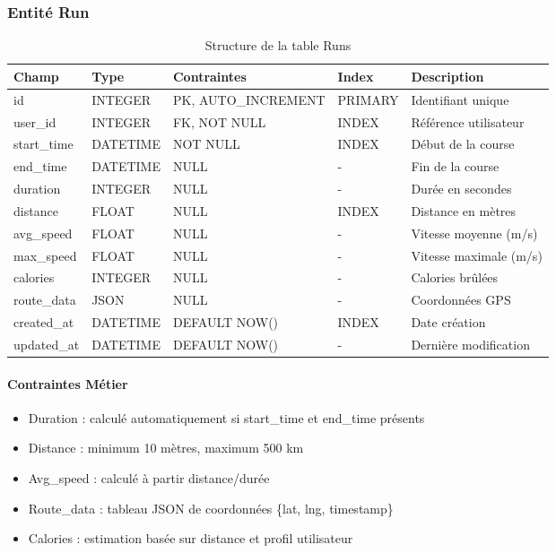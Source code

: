 \subsubsection{Entité Run}

\begin{table}[H]
\centering
\begin{tabular}{|l|l|l|l|p{4cm}|}
\hline
\textbf{Champ} & \textbf{Type} & \textbf{Contraintes} & \textbf{Index} & \textbf{Description} \\
\hline
id & INTEGER & PK, AUTO\_INCREMENT & PRIMARY & Identifiant unique \\
user\_id & INTEGER & FK, NOT NULL & INDEX & Référence utilisateur \\
start\_time & DATETIME & NOT NULL & INDEX & Début de la course \\
end\_time & DATETIME & NULL & - & Fin de la course \\
duration & INTEGER & NULL & - & Durée en secondes \\
distance & FLOAT & NULL & INDEX & Distance en mètres \\
avg\_speed & FLOAT & NULL & - & Vitesse moyenne (m/s) \\
max\_speed & FLOAT & NULL & - & Vitesse maximale (m/s) \\
calories & INTEGER & NULL & - & Calories brûlées \\
route\_data & JSON & NULL & - & Coordonnées GPS \\
created\_at & DATETIME & DEFAULT NOW() & INDEX & Date création \\
updated\_at & DATETIME & DEFAULT NOW() & - & Dernière modification \\
\hline
\end{tabular}
\caption{Structure de la table Runs}
\end{table}

\paragraph{Contraintes Métier}
\begin{itemize}
    \item Duration : calculé automatiquement si start\_time et end\_time présents
    \item Distance : minimum 10 mètres, maximum 500 km
    \item Avg\_speed : calculé à partir distance/durée
    \item Route\_data : tableau JSON de coordonnées \{lat, lng, timestamp\}
    \item Calories : estimation basée sur distance et profil utilisateur
\end{itemize}

